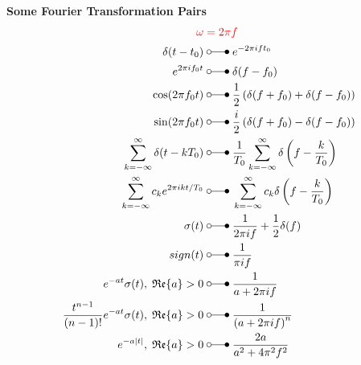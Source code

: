 \textbf{Some Fourier Transformation Pairs}
\begin{align*}
    {\color{red} \omega}\;                                                    & {\color{red} =2\pi f}                                                                  \\
    \delta(t-t_0) \;                                                          & \laplace\;  e^{-2\pi ift_{0}}                                                          \\
    e^{2\pi if_0t} \;                                                         & \laplace\;  \delta(f-f_{0})                                                            \\
    \cos(2\pi f_0t) \;                                                        & \laplace\;  \frac{1}{2}\left(\delta(f+f_0)+\delta(f-f_0)\right)                        \\
    \sin(2\pi f_0t) \;                                                        & \laplace\;  \frac{i}{2}\left(\delta(f+f_0)-\delta(f-f_0)\right)                        \\
    \sum_{k=-\infty}^{\infty}\delta(t-kT_0) \;                                & \laplace\;  \frac{1}{T_0}\sum_{k=-\infty}^{\infty}\delta\left(f-\frac{k}{T_0}\right)   \\
    \sum_{k=-\infty}^{\infty}c_{k}e^{2\pi ikt/T_0} \;                         & \laplace\;  \sum_{k=-\infty}^{\infty}c_k\delta\left(f-\frac{k}{T_0}\right)             \\
    \sigma(t) \;                                                              & \laplace\;  \frac{1}{2\pi if}+\frac12\delta(f)                                         \\
    sign(t) \;                                                                & \laplace\;  \frac{1}{\pi if}                                                           \\
    e^{-at}\sigma(t),\;\mathfrak{Re}\{a\}>0 \;                                & \laplace\;  \frac{1}{a+2\pi if}                                                        \\
    \frac{t^{n-1}}{(n-1)!}e^{-at}\sigma(t),\;\mathfrak{Re}\{a\}>0 \;          & \laplace\;  \frac{1}{{(a+2\pi if)}^n}                                                  \\
    e^{-a|t|},\;\mathfrak{Re}\{a\}>0 \;                                       & \laplace\;  \frac{2a}{a^2+4\pi^2f^2}                                                   \\

\end{align*}
